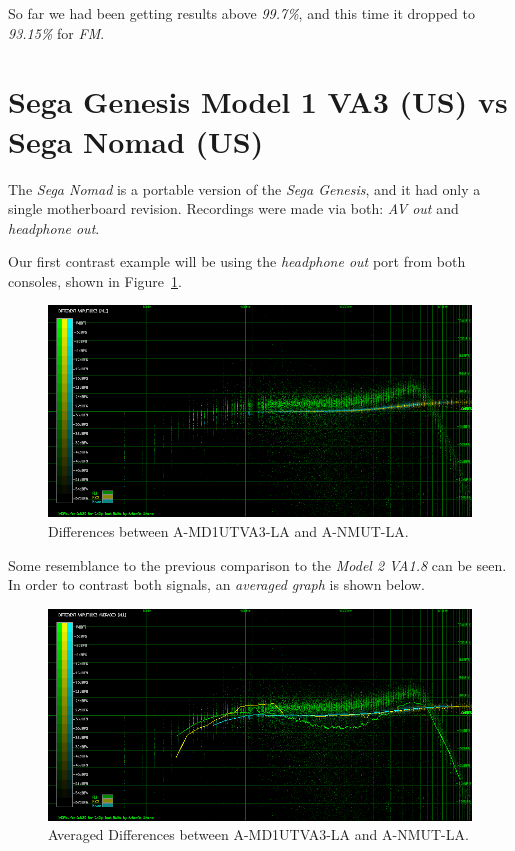 \documentclass[10pt,a4paper]{report}
\begin{document}
So far we had been getting results above \textit{99.7\%}, and this time it dropped to \textit{93.15\%} for \textit{FM}.

\section{Sega Genesis Model 1 VA3 (US) vs\\ Sega Nomad (US)}

The \textit{Sega Nomad} is a portable version of the \textit{Sega Genesis}, and it had only a single motherboard revision. Recordings were made via both: \textit{AV out} and \textit{headphone out}. 

Our first contrast example will be using the \textit{headphone out} port from both consoles, shown in Figure~\ref{fig:A-MD1UTVA3-LA_vs_A-NMUT-LA}.

\begin{figure}[H]
	\centering
	\includegraphics[width=1.0\linewidth]{images/results/6-A-MD1UTVA3-LA_vs_A-NMUT-LA.png}
	\caption[A-MD1UTVA3-LA vs A-NMUT-LA]{Differences between A-MD1UTVA3-LA and A-NMUT-LA.}
	\label{fig:A-MD1UTVA3-LA_vs_A-NMUT-LA}
\end{figure}

Some resemblance to the previous comparison to the \textit{Model 2 VA1.8} can be seen. In order to contrast both signals, an \textit{averaged graph} is shown below.

\begin{figure}[H]
	\centering
	\includegraphics[width=1.0\linewidth]{images/results/6-A-MD1UTVA3-LA_vs_A-NMUT-LA-AVG.png}
	\caption[A-MD1UTVA3-LA vs A-NMUT-LA AVG]{Averaged Differences between A-MD1UTVA3-LA and A-NMUT-LA.}
	\label{fig:A-MD1UTVA3-LA_vs_A-NMUT-LA_AVG}
\end{figure}
\end{document}
